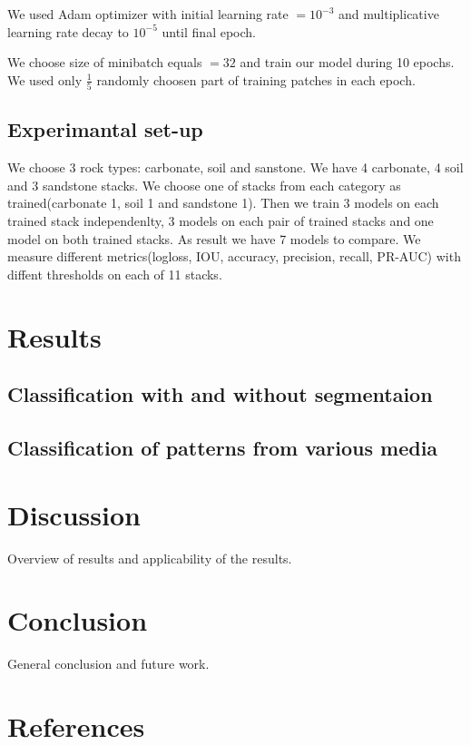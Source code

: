 \documentclass[review]{elsarticle}
\begin{document}
We used Adam optimizer with initial learning rate $=10^{-3}$ and 
multiplicative learning rate decay to $10^{-5}$ until final epoch.

We choose size of minibatch equals $=32$ and train our model during 10 epochs. We used only $\frac{1}{5}$ randomly choosen part of training patches in each epoch.

\subsection{Experimantal set-up}
We choose 3 rock types: carbonate, soil and sanstone. We have 
4 carbonate, 4 soil and 3 sandstone stacks. We choose one of stacks from each category as trained(carbonate 1, soil 1 and sandstone 1).
Then we train 3 models on each trained stack independenlty, 3 models on each pair of trained stacks and one model on both trained stacks.
As result we have 7 models to compare.
We measure different metrics(logloss, IOU, accuracy, precision, recall, PR-AUC) with diffent thresholds on each of 11 stacks.


\section{Results}

\subsection{Classification with and without segmentaion}

\subsection{Classification of patterns from various media}

\section{Discussion}
Overview of results and applicability of the results.

\section{Conclusion}
General conclusion and future work.

\section*{References}


\end{document}
